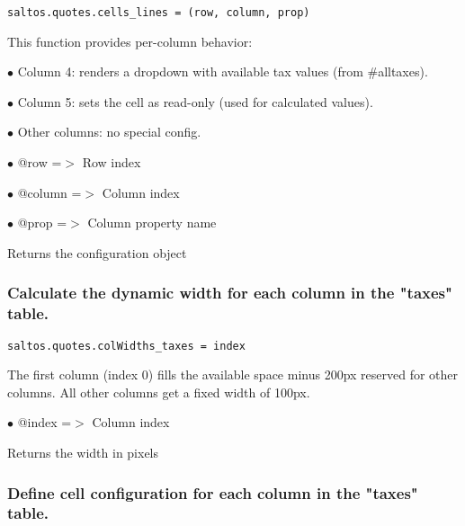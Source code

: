 \documentclass[a4paper]{article}
\begin{document}
\begin{lstlisting}
saltos.quotes.cells_lines = (row, column, prop)
\end{lstlisting}

This function provides per-column behavior:

\begin{compactitem}
\item[\color{myblue}$\bullet$] Column 4: renders a dropdown with available tax values (from \#alltaxes).
\item[\color{myblue}$\bullet$] Column 5: sets the cell as read-only (used for calculated values).
\item[\color{myblue}$\bullet$] Other columns: no special config.
\end{compactitem}

\begin{compactitem}
\item[\color{myblue}$\bullet$] @row    =$>$ Row index
\item[\color{myblue}$\bullet$] @column =$>$ Column index
\item[\color{myblue}$\bullet$] @prop   =$>$ Column property name
\end{compactitem}

Returns the configuration object

\hypertarget{toc43}{}
\subsubsection{Calculate the dynamic width for each column in the "taxes" table.}

\begin{lstlisting}
saltos.quotes.colWidths_taxes = index
\end{lstlisting}

The first column (index 0) fills the available space minus 200px reserved for other columns.
All other columns get a fixed width of 100px.

\begin{compactitem}
\item[\color{myblue}$\bullet$] @index =$>$ Column index
\end{compactitem}

Returns the width in pixels

\hypertarget{toc44}{}
\subsubsection{Define cell configuration for each column in the "taxes" table.}
\end{document}
